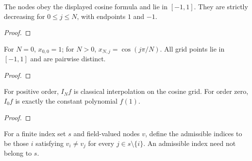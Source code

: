 \begin{supporting}

\begin{theorem}
\label{thm:classical-chebyshev-nodes}
\leanok
The nodes obey the displayed cosine formula and lie in $[-1,1]$.
They are strictly decreasing for $0\le j\le N$, with endpoints $1$ and $-1$.
\end{theorem}
\begin{proof}
\leanok
\end{proof}

\begin{theorem}
\label{thm:extrema-grid}
\leanok
For $N=0$, $x_{0,0}=1$; for $N>0$, $x_{N,j}=\cos(j\pi/N)$. All grid points lie in
$[-1,1]$ and are pairwise distinct.
\end{theorem}
\begin{proof}
\leanok
\end{proof}

\begin{theorem}
\label{thm:extrema-interpolant-definition}
\leanok
For positive order, $I_Nf$ is classical interpolation on the cosine grid.
For order zero, $I_0f$ is exactly the constant polynomial $f(1)$.
\end{theorem}
\begin{proof}
\leanok
\end{proof}

\begin{definition}
\label{def:lagrange-input}
\leanok
For a finite index set $s$ and field-valued nodes $v$, define the admissible
indices to be those $i$ satisfying $v_i\ne v_j$ for every
$j\in s\setminus\{i\}$. An admissible index need not belong to $s$.
\end{definition}


\end{supporting}

